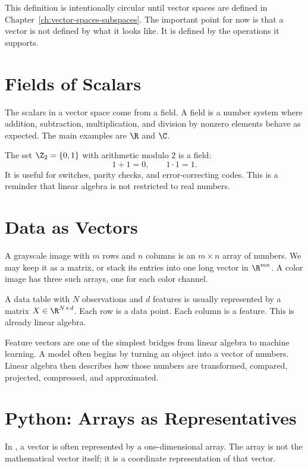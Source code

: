 This definition is intentionally circular until vector spaces are defined in
Chapter~\ref{ch:vector-spaces-subspaces}. The important point for now is that a
vector is not defined by what it looks like. It is defined by the operations it
supports.

\section{Fields of Scalars}

The scalars in a vector space come from a field. A field is a number system
where addition, subtraction, multiplication, and division by nonzero elements
behave as expected. The main examples are $\R$ and $\C$.

\begin{example}
The set $\Z_2=\{0,1\}$ with arithmetic modulo $2$ is a field:
\[
  1+1=0,\qquad 1\cdot 1=1.
\]
It is useful for switches, parity checks, and error-correcting codes. This is
a reminder that linear algebra is not restricted to real numbers.
\end{example}

\section{Data as Vectors}

A grayscale image with $m$ rows and $n$ columns is an $m\times n$ array of
numbers. We may keep it as a matrix, or stack its entries into one long vector
in $\R^{mn}$. A color image has three such arrays, one for each color channel.

A data table with $N$ observations and $d$ features is usually represented by
a matrix $X\in \R^{N\times d}$. Each row is a data point. Each column is a
feature. This is already linear algebra.

\begin{aimlbox}
Feature vectors are one of the simplest bridges from linear algebra to machine
learning. A model often begins by turning an object into a vector of numbers.
Linear algebra then describes how those numbers are transformed, compared,
projected, compressed, and approximated.
\end{aimlbox}

\section{Python: Arrays as Representatives}

In \Python, a vector is often represented by a one-dimensional \NumPy array.
The array is not the mathematical vector itself; it is a coordinate
representation of that vector.

